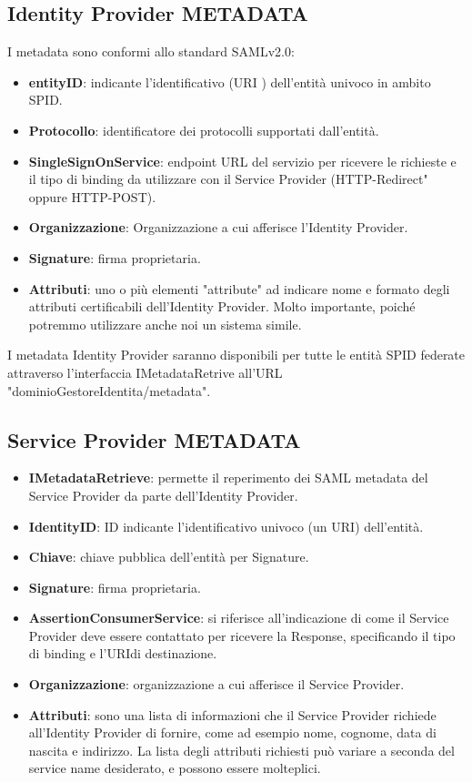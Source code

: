 \subsection{Identity Provider METADATA}
I metadata sono conformi allo standard SAMLv2.0:
\begin{itemize}
    \item \textbf{entityID}: indicante l’identificativo (URI\glo
    ) dell’entità univoco in ambito SPID.
    \item \textbf{Protocollo}: identificatore dei protocolli supportati dall'entità.
    \item \textbf{SingleSignOnService}: endpoint URL del servizio per ricevere le richieste e il tipo di binding da utilizzare con il Service Provider (HTTP-Redirect" oppure HTTP-POST).
    \item \textbf{Organizzazione}: Organizzazione a cui afferisce l'Identity Provider.
    \item \textbf{Signature}: firma proprietaria.
    \item \textbf{Attributi}: uno o più elementi "attribute" ad indicare nome e formato degli attributi certificabili dell’Identity Provider.
    Molto importante, poiché potremmo utilizzare anche noi un sistema simile.
\end{itemize}
I metadata Identity Provider saranno disponibili per tutte le entità SPID federate attraverso
l’interfaccia IMetadataRetrive all'URL "dominioGestoreIdentita/metadata".

\subsection{Service Provider METADATA}

\begin{itemize}
    \item \textbf{IMetadataRetrieve}: permette il reperimento dei SAML metadata del Service Provider da parte dell’Identity Provider.
    \item \textbf{IdentityID}: ID indicante l’identificativo univoco (un URI\glo) dell’entità.
    \item \textbf{Chiave}: chiave pubblica dell'entità per Signature.
    \item \textbf{Signature}: firma proprietaria.
    \item \textbf{AssertionConsumerService}: si riferisce all'indicazione di come il Service Provider deve essere contattato per ricevere la Response, specificando il tipo di binding e l'URI\glo di destinazione.
    \item \textbf{Organizzazione}: organizzazione a cui afferisce il Service Provider.
    \item \textbf{Attributi}: sono una lista di informazioni che il Service Provider richiede all'Identity Provider di fornire, come ad esempio nome, cognome, data di nascita e indirizzo. La lista degli attributi richiesti può variare a seconda del service name desiderato, e possono essere molteplici.
\end{itemize}

